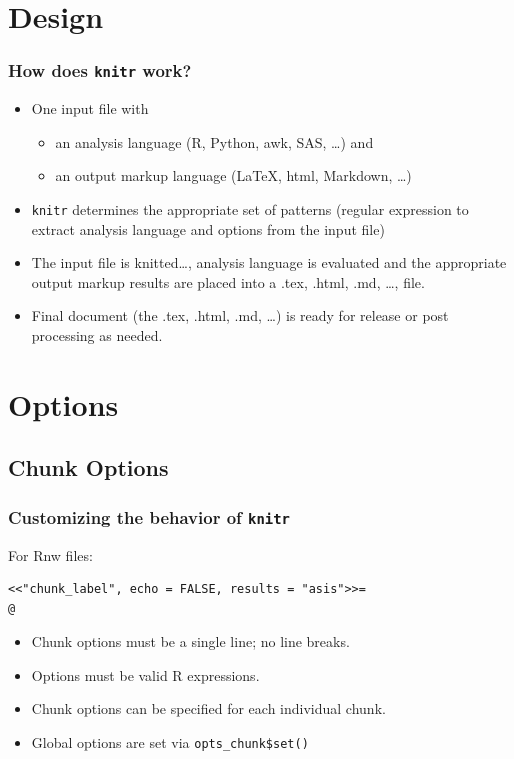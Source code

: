 \documentclass[t]{beamer}\usepackage[]{graphicx}\usepackage[]{color}
\begin{document}
\section{Design}
\begin{frame}[fragile]
  \frametitle{How does {\tt knitr} work?}
  \begin{itemize}
    \item One input file with 
      \begin{itemize}
        \item an analysis language (R, Python, awk, SAS, \ldots) and 
        \item an output markup language (\LaTeX, html, Markdown, \ldots)
      \end{itemize}

    \item {\tt knitr} determines the appropriate set of patterns (regular
      expression to extract analysis language and options from the input file)

    \item The input file is knitted\ldots, analysis language is evaluated and
      the appropriate output markup results are placed into a .tex, .html, .md,
      \ldots, file.

    \item Final document (the .tex, .html, .md, \ldots)  is ready for release or
      post processing as needed.

  \end{itemize}
\end{frame} 


\section{Options}
\subsection{Chunk Options}
\begin{frame}[fragile]
  \frametitle{Customizing the behavior of {\tt knitr}}
  For Rnw files:

  \begin{verbatim}<<"chunk_label", echo = FALSE, results = "asis">>=
@
  \end{verbatim}
  \begin{itemize}
    \item Chunk options must be a single line; no line breaks.  
    \item Options must be valid R expressions.
    \item Chunk options can be specified for each individual chunk.
    \item Global options are set via \verb;opts_chunk$set();
  \end{itemize}
\end{frame}
\end{document}
